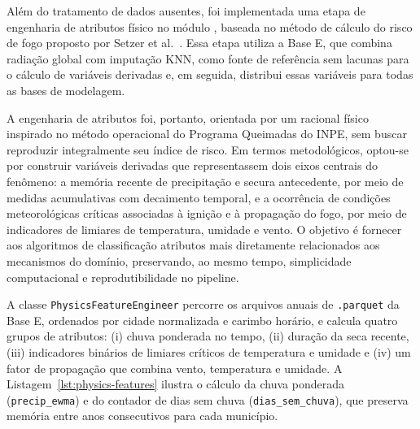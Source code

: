 Além do tratamento de dados ausentes, foi implementada uma etapa de engenharia de atributos físico no módulo , baseada no método de cálculo do risco de fogo proposto por Setzer et al.\ \cite{setzer2019metodo}. Essa etapa utiliza a Base E, que combina radiação global com imputação KNN, como fonte de referência sem lacunas para o cálculo de variáveis derivadas e, em seguida, distribui essas variáveis para todas as bases de modelagem.

A engenharia de atributos foi, portanto, orientada por um racional físico inspirado no método operacional do Programa Queimadas do INPE, sem buscar reproduzir integralmente seu índice de risco. Em termos metodológicos, optou-se por construir variáveis derivadas que representassem dois eixos centrais do fenômeno: a memória recente de precipitação e secura antecedente, por meio de medidas acumulativas com decaimento temporal, e a ocorrência de condições meteorológicas críticas associadas à ignição e à propagação do fogo, por meio de indicadores de limiares de temperatura, umidade e vento. O objetivo é fornecer aos algoritmos de classificação atributos mais diretamente relacionados aos mecanismos do domínio, preservando, ao mesmo tempo, simplicidade computacional e reprodutibilidade no pipeline.

A classe \texttt{PhysicsFeatureEngineer} percorre os arquivos anuais de \texttt{.parquet} da Base E, ordenados por cidade normalizada e carimbo horário, e calcula quatro grupos de atributos: (i) chuva ponderada no tempo, (ii) duração da seca recente, (iii) indicadores binários de limiares críticos de temperatura e umidade e (iv) um fator de propagação que combina vento, temperatura e umidade. A Listagem~\ref{lst:physics-features} ilustra o cálculo da chuva ponderada (\texttt{precip\_ewma}) e do contador de dias sem chuva (\texttt{dias\_sem\_chuva}), que preserva memória entre anos consecutivos para cada município.

